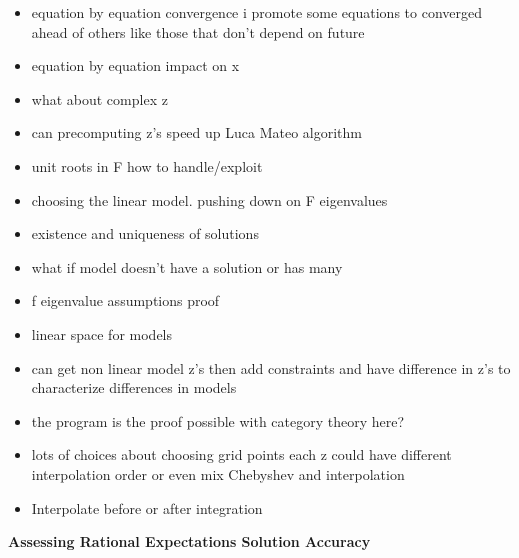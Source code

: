 \documentclass[12pt]{article}
\begin{document}
\begin{description}
  \begin{itemize}
  \item equation by equation convergence i promote some equations to converged ahead of others like those that don't depend on future
  \item equation by equation impact on x
  \item what about complex z
  \item can precomputing z's speed up Luca Mateo algorithm
  \item unit roots in F how to handle/exploit
  \item choosing the linear model.  pushing down on F eigenvalues
  \item existence and uniqueness of solutions
\item what if model doesn't have a solution or has many
\item f eigenvalue assumptions proof
\item linear space for models
\item can get non linear model z's then add constraints and have difference in z's to characterize differences in models
\item the program is the proof possible with category theory here?
\item lots of choices about choosing grid points each z could have different interpolation order or even mix Chebyshev and interpolation
\item Interpolate before or after integration
  \end{itemize}
\end{description}









  






\appendix




\newpage


  {\bf Assessing Rational Expectations Solution Accuracy}
\end{document}
